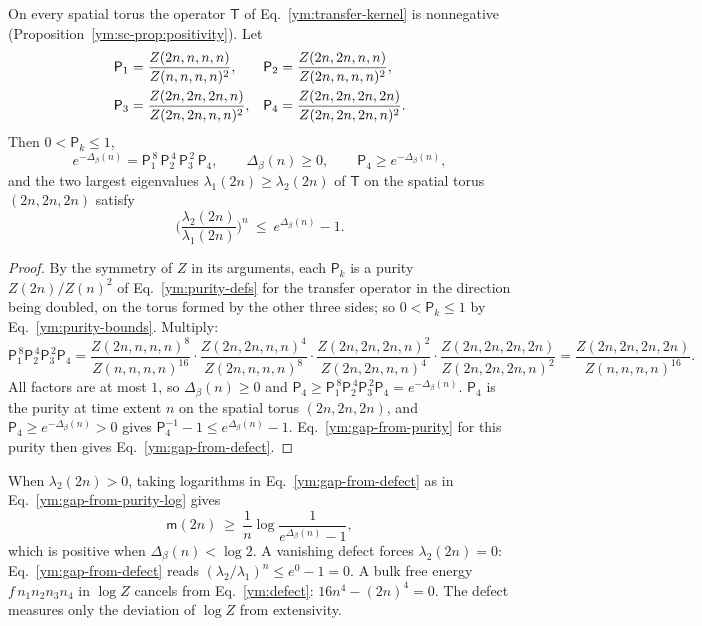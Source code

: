 \begin{proposition}\label{ym:prop:defect}
On every spatial torus the operator $\mathsf T$ of
Eq.~\eqref{ym:transfer-kernel} is nonnegative
(Proposition~\ref{ym:sc-prop:positivity}). Let
\begin{align}
 \mathsf P_1&=\frac{Z(2n,n,n,n)}{Z(n,n,n,n)^2},&
 \mathsf P_2&=\frac{Z(2n,2n,n,n)}{Z(2n,n,n,n)^2},\notag\\
 \mathsf P_3&=\frac{Z(2n,2n,2n,n)}{Z(2n,2n,n,n)^2},&
 \mathsf P_4&=\frac{Z(2n,2n,2n,2n)}{Z(2n,2n,2n,n)^2}.\label{ym:four-purities}
\end{align}
Then $0<\mathsf P_k\le1$,
\begin{equation}\label{ym:defect-telescope}
 e^{-\Delta_\beta(n)}=\mathsf P_1^{\,8}\,\mathsf P_2^{\,4}\,\mathsf P_3^{\,2}\,
 \mathsf P_4,\qquad\Delta_\beta(n)\ge0,\qquad
 \mathsf P_4\ge e^{-\Delta_\beta(n)},
\end{equation}
and the two largest eigenvalues $\lambda_1(2n)\ge\lambda_2(2n)$ of $\mathsf T$
on the spatial torus $(2n,2n,2n)$ satisfy
\begin{equation}\label{ym:gap-from-defect}
 \Big(\frac{\lambda_2(2n)}{\lambda_1(2n)}\Big)^n\ \le\ e^{\Delta_\beta(n)}-1 .
\end{equation}
\end{proposition}
\begin{proof}
By the symmetry of $Z$ in its arguments, each $\mathsf P_k$ is a purity
$Z(2n)/Z(n)^2$ of Eq.~\eqref{ym:purity-defs} for the transfer operator in the
direction being doubled, on the torus formed by the other three sides; so
$0<\mathsf P_k\le1$ by Eq.~\eqref{ym:purity-bounds}. Multiply:
\begin{equation}
 \mathsf P_1^{\,8}\mathsf P_2^{\,4}\mathsf P_3^{\,2}\mathsf P_4
 =\frac{Z(2n,n,n,n)^8}{Z(n,n,n,n)^{16}}\cdot
  \frac{Z(2n,2n,n,n)^4}{Z(2n,n,n,n)^{8}}\cdot
  \frac{Z(2n,2n,2n,n)^2}{Z(2n,2n,n,n)^{4}}\cdot
  \frac{Z(2n,2n,2n,2n)}{Z(2n,2n,2n,n)^{2}}
 =\frac{Z(2n,2n,2n,2n)}{Z(n,n,n,n)^{16}} .
\end{equation}
All factors are at most $1$, so $\Delta_\beta(n)\ge0$ and
$\mathsf P_4\ge\mathsf P_1^{\,8}\mathsf P_2^{\,4}\mathsf P_3^{\,2}\mathsf P_4
=e^{-\Delta_\beta(n)}$. $\mathsf P_4$ is the purity at time extent $n$ on the
spatial torus $(2n,2n,2n)$, and $\mathsf P_4\ge e^{-\Delta_\beta(n)}>0$ gives
$\mathsf P_4^{-1}-1\le e^{\Delta_\beta(n)}-1$. Eq.~\eqref{ym:gap-from-purity}
for this purity then gives Eq.~\eqref{ym:gap-from-defect}.
\end{proof}
When $\lambda_2(2n)>0$, taking logarithms in Eq.~\eqref{ym:gap-from-defect}
as in Eq.~\eqref{ym:gap-from-purity-log} gives
\begin{equation}\label{ym:gap-from-defect-log}
 \mathsf m(2n)\ \ge\ \frac1n\log\frac{1}{e^{\Delta_\beta(n)}-1},
\end{equation}
which is positive when $\Delta_\beta(n)<\log2$. A vanishing defect forces
$\lambda_2(2n)=0$: Eq.~\eqref{ym:gap-from-defect} reads
$(\lambda_2/\lambda_1)^n\le e^0-1=0$.
A bulk free energy $f\,n_1n_2n_3n_4$ in $\log Z$ cancels from
Eq.~\eqref{ym:defect}: $16n^4-(2n)^4=0$. The defect measures only the
deviation of $\log Z$ from extensivity.

